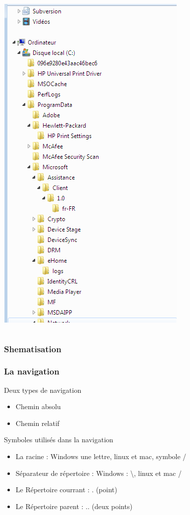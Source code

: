 \documentclass{beamer}
\begin{document}
\begin{frame}
\begin{columns}
\begin{column}[c]{5cm}
				\includegraphics[scale=0.25]{image/ArboWin.png}
			\end{column}
		\end{columns}
	\end{frame}
	\begin{frame}
		\frametitle{Shematisation}
		\begin{center}
			
		\end{center}
	\end{frame}	

	\begin{frame}
		\frametitle{La navigation}
		\begin{block}{Deux types de navigation}
			\begin{itemize}
				\item Chemin absolu
				\item Chemin relatif
			\end{itemize}
		\end{block}
		\begin{block}{Symboles utilisés dans la navigation}
			\begin{itemize}
				\item La racine : Windows une lettre, linux et mac, symbole / 
				\item Séparateur de répertoire : Windows : \textbackslash, linux et mac  /
				\item Le Répertoire courrant : . (point)
				\item Le Répertoire parent : .. (deux points)
			\end{itemize}
		\end{block}
	\end{frame}
\end{document}
